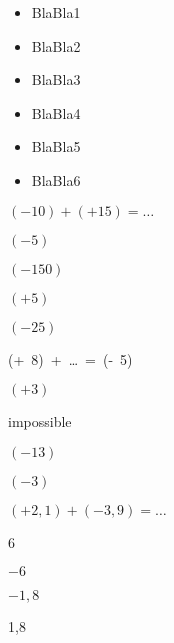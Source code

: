 \begin{acquis}
\begin{itemize}
\item BlaBla1
\item BlaBla2
\item BlaBla3
\item BlaBla4
\item BlaBla5
\item BlaBla6
\end{itemize}
\end{acquis}


\begin{QCM}
  \begin{GroupeQCM}
    \begin{exercice}
      $(- 10) + (+ 15) = \ldots$
      \begin{ChoixQCM}{4}
      \item $(- 5)$
      \item $(- 150)$
      \item $(+ 5)$
      \item $(- 25)$
      \end{ChoixQCM}
\begin{corrige}
   \end{corrige}
    \end{exercice}
    
    
    \begin{exercice}
      (+ 8) + \ldots = (- 5)
      \begin{ChoixQCM}{4}
      \item $(+ 3)$
      \item impossible
      \item $(- 13)$
      \item $(- 3)$
      \end{ChoixQCM}
\begin{corrige}
   \end{corrige}
    \end{exercice}
    
    
    \begin{exercice}
      $(+ 2,1) + (- 3,9) = \ldots$
      \begin{ChoixQCM}{4}
      \item 6
      \item $- 6$
      \item $- 1,8$
      \item 1,8
      \end{ChoixQCM}
\begin{corrige}
   \end{corrige}
    \end{exercice}
    

\end{GroupeQCM}
\end{QCM}
